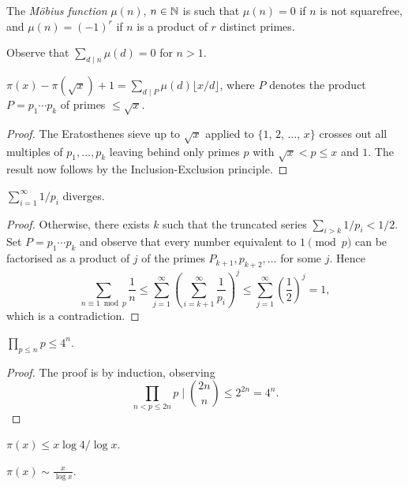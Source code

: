 \documentclass[a4paper, 10pt, twocolumn]{amsart}
\begin{document}
\begin{definition}
    The \emph{Möbius function} $\mu(n)$, $n \in \mathbb{N}$ is such that $\mu(n) = 0$ if $n$ is not squarefree, and $\mu(n) = (-1)^r$ if $n$ is a product of $r$ distinct primes. 
\end{definition}

Observe that $\sum_{d \mid n} \mu(d) = 0$ for $n> 1$.

\begin{theorem}
$\pi(x) - \pi(\sqrt{x}) + 1 = \sum_{d \mid P} \mu(d) \lfloor x/d\rfloor$, where $P$ denotes the product $P = p_1 \cdots p_k$ of primes $\leq \sqrt{x}$.
\end{theorem}
\begin{proof}
    The Eratosthenes sieve up to $\sqrt{x}$ applied to $\{1$, $2$, $\dots$, $x\}$ crosses out all multiples of $p_1, \dots, p_k$ leaving behind only primes $p$ with $\sqrt{x} < p \leq x$ and $1$. The result now follows by the Inclusion-Exclusion principle.
\end{proof}

\begin{theorem}
    $\sum_{i = 1}^{\infty} 1/p_i$ diverges.
\end{theorem}
\begin{proof}
    Otherwise, there exists $k$ such that the truncated series $\sum_{i > k} 1/p_i < 1/2$. Set $P = p_1 \cdots p_k$ and observe that every number equivalent to $1\pmod{p}$ can be factorised as a product of $j$ of the primes $P_{k+1}, p_{k+2}, \dots$ for some $j$. Hence
    $$
    \sum_{n \equiv 1 \bmod{p}} \frac{1}{n} \leq \sum_{j = 1}^{\infty} \left(\sum_{i = k + 1}^{\infty} \frac{1}{p_i}\right)^j \leq \sum_{j = 1}^{\infty} \left(\frac{1}{2}\right)^j = 1,
$$
which is a contradiction.
\end{proof}


\begin{theorem}
    $\prod_{p \leq n} p \leq 4^n$.
\end{theorem}
\begin{proof}
The proof is by induction, observing 
$$
\prod_{n < p \leq 2n} p \mid \binom{2n}{n} \leq 2^{2n} = 4^n.
$$
\end{proof}

\begin{corollary}
    $\pi(x) \leq x \log 4/\log x$.
\end{corollary}

\begin{theorem}
$\pi(x) \sim \frac{x}{\log x}$.
\end{theorem}
\end{document}
